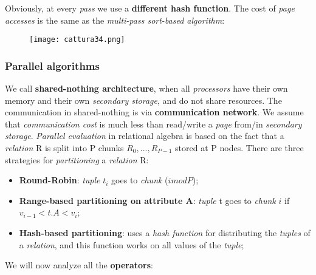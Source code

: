 \documentclass{article}
\begin{document}
Obviously, at every \emph{pass} we use a \textbf{different hash function}. The cost of \emph{page accesses} is the same as the \emph{multi-pass sort-based algorithm}:
\begin{figure}[H]
  \centering
  \texttt{[image: cattura34.png]}
\end{figure}
\clearpage
\subsubsection{Parallel algorithms}
We call \textbf{shared-nothing architecture}, when all \emph{processors} have their own memory and their own \emph{secondary storage}, and do not share resources. The communication in shared-nothing is via \textbf{communication network}. We assume that \emph{communication cost} is much less than read/write a \emph{page} from/in \emph{secondary storage}. \emph{Parallel evaluation} in relational algebra is based on the fact that a \emph{relation} R is split into P chunks $R_0, ... , R_{P-1}$ stored at P nodes. There are three strategies for \emph{partitioning} a \emph{relation} R:
\begin{itemize}
\item \textbf{Round-Robin}: \emph{tuple} $t_i$ goes to \emph{chunk} ($i mod P$);
\item \textbf{Range-based partitioning on attribute A}: \emph{tuple} t goes to \emph{chunk} $i$ if $v_{i-1} < t.A < v_i$;
\item \textbf{Hash-based partitioning}: uses a \emph{hash function} for distributing the \emph{tuples} of a \emph{relation}, and this function works on all values of the \emph{tuple};
\end{itemize}
We will now analyze all the \textbf{operators}:
\end{document}
